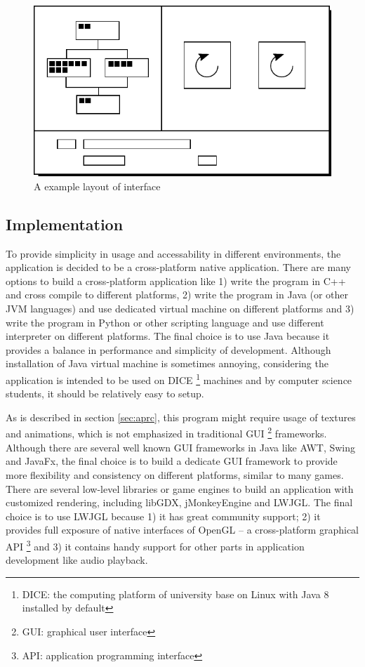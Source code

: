 \documentclass[a4paper,11pt]{article}
\begin{document}
\begin{figure}[htpb]
    \centering
    \includegraphics[width=0.45\columnwidth]{layout.pdf}
    \caption{A example layout of interface}
    \vspace{-1.5em}
    \label{fig:layout}
\end{figure}

\subsection{Implementation}

To provide simplicity in usage and accessability in different environments, the application is decided to be a cross-platform native application. There are many options to build a cross-platform application like 1) write the program in C++ and cross compile to different platforms, 2) write the program in Java (or other JVM languages) and use dedicated virtual machine on different platforms and 3) write the program in Python or other scripting language and use different interpreter on different platforms. The final choice is to use Java because it provides a balance in performance and simplicity of development. Although installation of Java virtual machine is sometimes annoying, considering the application is intended to be used on DICE \footnote{DICE: the computing platform of university base on Linux with Java 8 installed by default} machines and by computer science students, it should be relatively easy to setup.

As is described in section \ref{sec:aprc}, this program might require usage of textures and animations, which is not emphasized in traditional GUI \footnote{GUI: graphical user interface} frameworks. Although there are several well known GUI frameworks in Java like AWT, Swing and JavaFx, the final choice is to build a dedicate GUI framework to provide more flexibility and consistency on different platforms, similar to many games. There are several low-level libraries or game engines to build an application with customized rendering, including libGDX, jMonkeyEngine and LWJGL. The final choice is to use LWJGL because 1) it has great community support; 2) it provides full exposure of native interfaces of OpenGL -- a cross-platform graphical API \footnote{API: application programming interface} and 3) it contains handy support for other parts in application development like audio playback.
\end{document}

